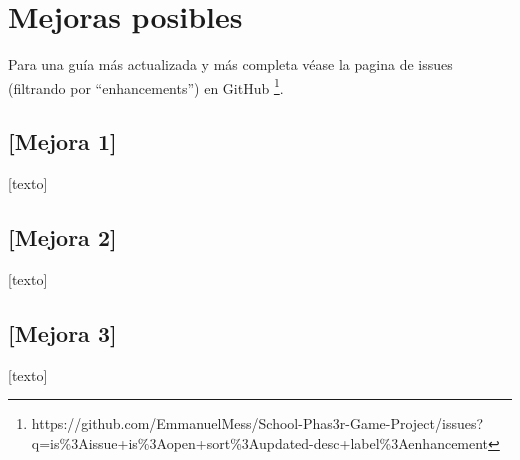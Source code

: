 \documentclass{article}
\begin{document}
   	\section*{Mejoras posibles}
	Para una guía más actualizada y más completa véase la pagina de issues (filtrando por ``enhancements'') en GitHub
	\footnote{https://github.com/EmmanuelMess/School-Phas3r-Game-Project/issues?q=is\%3Aissue+is\%3Aopen+sort\%3Aupdated-desc+label\%3Aenhancement}.
	
   	\subsection*{[Mejora 1]}
	
	[texto]
	
	\subsection*{[Mejora 2]}
	
	[texto]
	
	\subsection*{[Mejora 3]}

	[texto]
\end{document}
